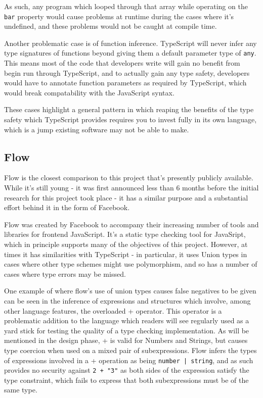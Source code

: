 \documentclass[british, twoside]{bhamthesis}
\theoremstyle{definition}
\begin{document}
    As such, any program which looped through that array while operating on the \texttt {bar} property would cause problems at runtime during the cases where it's undefined, and these problems would not be caught at compile time.

    Another problematic case is of function inference. TypeScript will never infer any type signatures of functions beyond giving them a default parameter type of \texttt{any}. This means most of the code that developers write will gain no benefit from begin run through TypeScript, and to actually gain any type safety, developers would have to annotate function parameters as required by TypeScript, which would break compatability with the JavaScript syntax.

    These cases highlight a general pattern in which reaping the benefits of the type safety which TypeScript provides requires you to invest fully in its own language, which is a jump existing software may not be able to make.

  \subsection{Flow}
    Flow is the closest comparison to this project that's presently publicly available. While it's still young - it was first announced less than 6 months before the initial research for this project took place - it has a similar purpose and a substantial effort behind it in the form of Facebook.

    Flow was created by Facebook to accompany their increasing number of tools and libraries for frontend JavaScript. It's a static type checking tool for JavaSript, which in principle supports many of the objectives of this project. However, at times it has similarities with TypeScript - in particular, it uses Union types in cases where other type schemes might use polymorphism, and so has a number of cases where type errors may be missed.

    One example of where flow's use of union types causes false negatives to be given can be seen in the inference of expressions and structures which involve, among other language features, the overloaded + operator. This operator is a problematic addition to the language which readers will see regularly used as a yard stick for testing the quality of a type checking implementation. As will be mentioned in the design phase, + is valid for Numbers and Strings, but causes type coercion when used on a mixed pair of subexpressions. Flow infers the types of expressions involved in a + operation as being \texttt{number | string}, and as such provides no security against \texttt{2 + "3"} as both sides of the expression satisfy the type constraint, which fails to express that both subexpressions must be of the same type.
\end{document}
